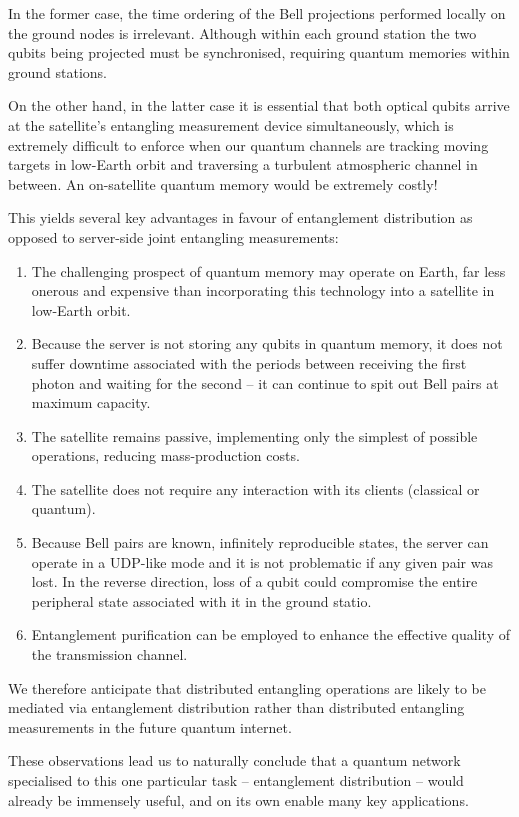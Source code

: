 In the former case, the time ordering of the Bell projections performed locally on the ground nodes is irrelevant. Although within each ground station the two qubits being projected must be synchronised, requiring quantum memories within ground stations.

On the other hand, in the latter case it is essential that both optical qubits arrive at the satellite's entangling measurement device simultaneously, which is extremely difficult to enforce when our quantum channels are tracking moving targets in low-Earth orbit and traversing a turbulent atmospheric channel in between. An on-satellite quantum memory would be extremely costly!

This yields several key advantages in favour of entanglement distribution as opposed to server-side joint entangling measurements:
\begin{enumerate}
	\item The challenging prospect of quantum memory may operate on Earth, far less onerous and expensive than incorporating this technology into a satellite in low-Earth orbit.
	\item Because the server is not storing any qubits in quantum memory, it does not suffer downtime associated with the periods between receiving the first photon and waiting for the second -- it can continue to spit out Bell pairs at maximum capacity.
	\item The satellite remains passive, implementing only the simplest of possible operations, reducing mass-production costs.
	\item The satellite does not require any interaction with its clients (classical or quantum).
	\item Because Bell pairs are known, infinitely reproducible states, the server can operate in a UDP-like mode and it is not problematic if any given pair was lost. In the reverse direction, loss of a qubit could compromise the entire peripheral state associated with it in the ground statio.
	\item Entanglement purification can be employed to enhance the effective quality of the transmission channel.
\end{enumerate}

We therefore anticipate that distributed entangling operations are likely to be mediated via entanglement distribution rather than distributed entangling measurements in the future quantum internet.

These observations lead us to naturally conclude that a quantum network specialised to this one particular task -- entanglement distribution -- would already be immensely useful, and on its own enable many key applications.